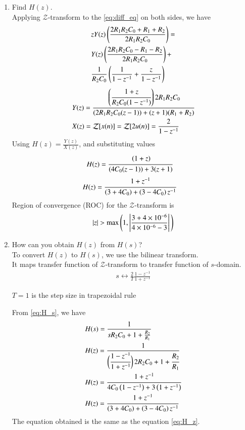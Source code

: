 \documentclass[journal,12pt,twocolumn]{IEEEtran}
\renewcommand\thesection{\arabic{section}}
\begin{document}
\begin{enumerate}[label=\arabic*.,ref=\thesection.\theenumi]
\item Find $H(z)$. \\
\solution
Applying $\mathcal{Z}$-transform to the \eqref{eq:diff_eq} on both sides, we have 
\begin{align}
\begin{split}
	&z Y(z) \left(\frac{2R_1 R_2 C_0 + R_1 + R_2}{2 R_1 R_2 C_0}\right) = \\ &Y(z) \left(\frac{2 R_1 R_2 C_0 - R_1 - R_2}{2 R_1 R_2 C_0}\right) + \\ &\frac{1}{R_2 C_0} \left(\frac{1}{1 - z^{-1}} + \frac{z}{1 - z^{-1}}\right)
\end{split}
\end{align}
\begin{align}
	&Y(z) = \cfrac{\left(\cfrac{1 + z}{R_2 C_0 (1 - z^{-1})}\right) 2 R_1 R_2 C_0}{(2R_1 R_2 C_0 (z-1)) + (z+1)(R_1 + R_2)} \label{eq:Y_z} \\
	&X(z) = \mathcal{Z}[x(n)] = \mathcal{Z}[2 u(n)] = \frac{2}{1 - z^{-1}}
\end{align}
Using $H(z) = \frac{Y(z)}{X(z)}$, and substituting values
\begin{align}
	&H(z) = \cfrac{\left(1 + z\right)}{(4 C_0 (z - 1)) + 3(z+1)}
\end{align}
\begin{align}
	&H(z) = \cfrac{1 + z^{-1}}{\left(3 + 4 C_0\right) + \left(3 - 4 C_0\right) z^{-1}} 
	\label{eq:H_z}
\end{align}
Region of convergence (ROC) for the $\mathcal{Z}$-transform is 
\begin{align}
	\left\vert z\right\vert > \text{max} \, \Biggl( 1, \left\vert\frac{3 + 4 \times 10^{-6}}{4 \times 10^{-6} - 3}\right\vert \, \Biggr) 
\end{align}
		

\item How can you obtain $H(z)$ from $H(s)$? \\
\solution
To convert $H(z)$ to $H(s)$, we use the bilinear transform. \\ It maps transfer function of $\mathcal{Z}$-transform to transfer function of $s$-domain. 
\begin{align}
	s \longleftrightarrow \frac{2}{T} \frac{1 - z^{-1}}{1 + z^{-1}}
\end{align}

$T = 1$ is the step size in trapezoidal rule

From \eqref{eq:H_s}, we have 
\begin{align}
	&H(s) = \frac{1}{s R_2 C_0 + 1 + \frac{R_2}{R_1}} \\
	&H(z) = \frac{1}{\biggl(\cfrac{1 - z^{-1}}{1 + z^{-1}} \biggr) \, 2 R_2 C_0 + 1 + \cfrac{R_2}{R_1}} \\
	&H(z) = \cfrac{1 + z^{-1}}{4 C_0 \left(1 - z^{-1}\right) + 3 \left(1 + z^{-1}\right)} \\
	&H(z) = \cfrac{1 + z^{-1}}{\left(3 + 4C_0\right) + \left(3 - 4 C_0\right)z^{-1}}
\end{align}
The equation obtained is the same as the equation \eqref{eq:H_z}.



\end{enumerate}
\end{document}
